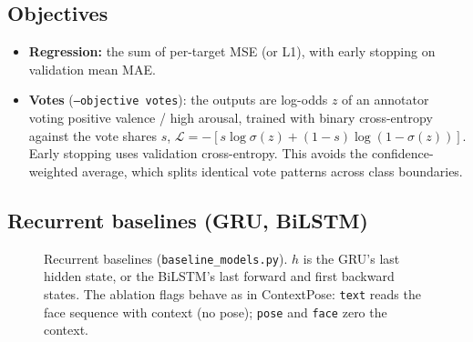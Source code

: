 \documentclass[11pt]{article}
\newcommand{\code}[1]{\texttt{#1}}
\begin{document}
\subsection{Objectives}
\begin{itemize}
  \item \textbf{Regression:} the sum of per-target MSE (or L1), with early stopping on validation mean MAE.
  \item \textbf{Votes} (\code{--objective votes}): the outputs are log-odds $z$ of an annotator voting positive valence / high arousal, trained with binary cross-entropy against the vote shares $s$, $\mathcal{L} = -[s \log \sigma(z) + (1-s) \log(1-\sigma(z))]$. Early stopping uses validation cross-entropy. This avoids the confidence-weighted average, which splits identical vote patterns across class boundaries.
\end{itemize}

\subsection{Recurrent baselines (GRU, BiLSTM)}
\begin{figure}[t]
\centering
{}
\caption{Recurrent baselines (\code{baseline\_models.py}). $h$ is the GRU's last hidden state, or the BiLSTM's last forward and first backward states. The ablation flags behave as in ContextPose: \code{text} reads the face sequence with context (no pose); \code{pose} and \code{face} zero the context.}
\label{fig:rnn}
\end{figure}
\end{document}
